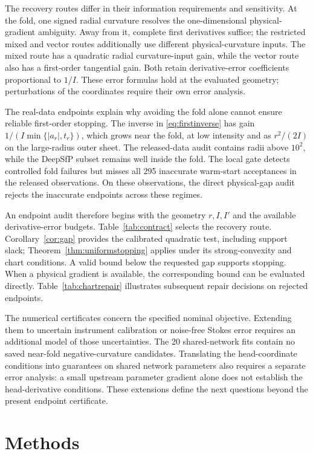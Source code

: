 \documentclass[pdflatex,sn-mathphys-num]{sn-jnl}
\begin{document}
The recovery routes differ in their information requirements and sensitivity. At the fold, one signed radial curvature resolves the one-dimensional physical-gradient ambiguity. Away from it, complete first derivatives suffice; the restricted mixed and vector routes additionally use different physical-curvature inputs. The mixed route has a quadratic radial curvature-input gain, while the vector route also has a first-order tangential gain. Both retain derivative-error coefficients proportional to $1/I$. These error formulas hold at the evaluated geometry; perturbations of the coordinates require their own error analysis.

The real-data endpoints explain why avoiding the fold alone cannot ensure reliable first-order stopping. The inverse in \eqref{eq:firstinverse} has gain $1/(I\min\{|a_r|,t_r\})$, which grows near the fold, at low intensity and as $r^2/(2I)$ on the large-radius outer sheet. The released-data audit contains radii above $10^2$, while the DeepSfP subset remains well inside the fold. The local gate detects controlled fold failures but misses all 295 inaccurate warm-start acceptances in the released observations. On these observations, the direct physical-gap audit rejects the inaccurate endpoints across these regimes.

An endpoint audit therefore begins with the geometry $r,I,I'$ and the available derivative-error budgets. Table~\ref{tab:contract} selects the recovery route. Corollary~\ref{cor:gap} provides the calibrated quadratic test, including support slack; Theorem~\ref{thm:uniformstopping} applies under its strong-convexity and chart conditions. A valid bound below the requested gap supports stopping. When a physical gradient is available, the corresponding bound can be evaluated directly. Table~\ref{tab:chartrepair} illustrates subsequent repair decisions on rejected endpoints.

The numerical certificates concern the specified nominal objective. Extending them to uncertain instrument calibration or noise-free Stokes error requires an additional model of those uncertainties. The 20 shared-network fits contain no saved near-fold negative-curvature candidates. Translating the head-coordinate conditions into guarantees on shared network parameters also requires a separate error analysis: a small upstream parameter gradient alone does not establish the head-derivative conditions. These extensions define the next questions beyond the present endpoint certificate.


\section{Methods}
\label{sec:methods}
\end{document}
